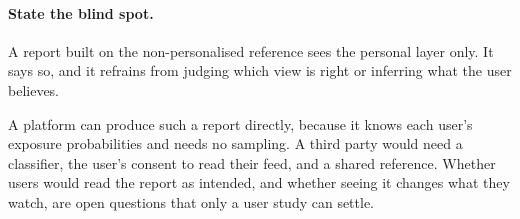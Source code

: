 \paragraph{State the blind spot.} A report built on the non-personalised reference sees the personal layer only. It says so, and it refrains from judging which view is right or inferring what the user believes.

A platform can produce such a report directly, because it knows each user's exposure probabilities and needs no sampling. A third party would need a classifier, the user's consent to read their feed, and a shared reference. Whether users would read the report as intended, and whether seeing it changes what they watch, are open questions that only a user study can settle.
